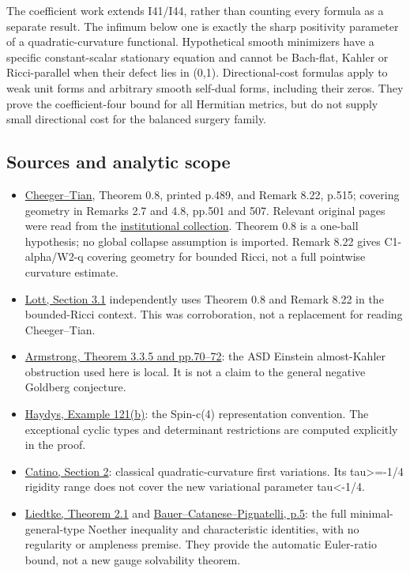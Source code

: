 \documentclass[
  10pt,
]{article}
\providecommand{\tightlist}{%
  \setlength{\itemsep}{0pt}\setlength{\parskip}{0pt}}
\begin{document}
The coefficient work extends I41/I44, rather than counting every formula
as a separate result. The infimum below one is exactly the sharp
positivity parameter of a quadratic-curvature functional. Hypothetical
smooth minimizers have a specific constant-scalar stationary equation
and cannot be Bach-flat, Kahler or Ricci-parallel when their defect lies
in (0,1). Directional-cost formulas apply to weak unit forms and
arbitrary smooth self-dual forms, including their zeros. They prove the
coefficient-four bound for all Hermitian metrics, but do not supply
small directional cost for the balanced surgery family.

\hypertarget{sources-and-analytic-scope}{%
\subsection{Sources and analytic
scope}\label{sources-and-analytic-scope}}

\begin{itemize}
\tightlist
\item
  \href{https://doi.org/10.1090/S0894-0347-05-00511-4}{Cheeger--Tian},
  Theorem 0.8, printed p.489, and Remark 8.22, p.515; covering geometry
  in Remarks 2.7 and 4.8, pp.501 and 507. Relevant original pages were
  read from the
  \href{https://www.math.stonybrook.edu/Courses/MAT683/201001/MAT683S10.pdf}{institutional
  collection}. Theorem 0.8 is a one-ball hypothesis; no global collapse
  assumption is imported. Remark 8.22 gives C1-alpha/W2-q covering
  geometry for bounded Ricci, not a full pointwise curvature estimate.
\item
  \href{https://math.berkeley.edu/~lott/4d3.pdf}{Lott, Section 3.1}
  independently uses Theorem 0.8 and Remark 8.22 in the bounded-Ricci
  context. This was corroboration, not a replacement for reading
  Cheeger--Tian.
\item
  \href{https://johnarmstrongmaths.com/publications/resources/thesis.pdf}{Armstrong,
  Theorem 3.3.5 and pp.70--72}: the ASD Einstein almost-Kahler
  obstruction used here is local. It is not a claim to the general
  negative Goldberg conjecture.
\item
  \href{https://haydys.net/misc/IntroGaugeTheory_LectNotes.pdf}{Haydys,
  Example 121(b)}: the Spin-c(4) representation convention. The
  exceptional cyclic types and determinant restrictions are computed
  explicitly in the proof.
\item
  \href{https://www.mate.polimi.it/wp-content/themes/mymate/send_new.php?file=qdd205\&tipo=1}{Catino,
  Section 2}: classical quadratic-curvature first variations. Its
  tau\textgreater=-1/4 rigidity range does not cover the new variational
  parameter tau\textless-1/4.
\item
  \href{https://arxiv.org/pdf/math/0702548}{Liedtke, Theorem 2.1} and
  \href{https://www.mathe8.uni-bayreuth.de/de/team/prof-fabrizio-catanese-old/pdf/101.pdf}{Bauer--Catanese--Pignatelli,
  p.5}: the full minimal-general-type Noether inequality and
  characteristic identities, with no regularity or ampleness premise.
  They provide the automatic Euler-ratio bound, not a new gauge
  solvability theorem.
\end{itemize}
\end{document}
